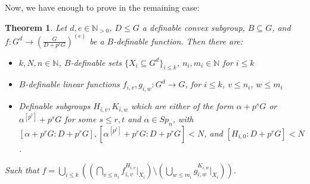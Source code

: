 \documentclass[a4paper,11pt]{article}
\newtheorem{theorem}{Theorem}[section]
\newcommand{\Spn}{Sp_n}
\begin{document}
\noindent Now, we have enough to prove  in the remaining case:
\begin{theorem}\label{prG uniformisable version}
    Let $d,e\in\mathbb{N}_{>0}$, $D\leq G$ a definable convex subgroup, $B\subseteq G$, and $f:G^d\rightarrow (\frac{G}{D+p^rG})^{(e)}$ be a $B$-definable function. Then there are:
    \begin{itemize}
        \item $k,N,n\in \mathbb{N}$, $B$-definable sets $\{X_i\subseteq G^d\}_{i\leq k}$, $n_i,m_i\in \mathbb{N}$ for $i\leq k$
        \item  $B$-definable linear functions $f_{i,v},g_{i,w}:G^d\rightarrow G$, for $i\leq k$, $v\leq n_i$, $w\leq m_i$
        \item Definable subgroups $H_{i,v},K_{i,w}$ which are either of the form $\alpha+p^sG$ or $\alpha^{[p^t]}+p^sG$ for some $s\leq r, t$ and $\alpha\in \Spn$, with $[\alpha+p^rG:D+p^rG], [\alpha^{[p^t]}+p^rG:D+p^rG]< N$, and $[H_{i,0}:D+p^rG]<N$. %
    \end{itemize}
    Such that $f = \bigcup\limits_{i\leq k}((\bigcap\limits_{v\leq n_i}f_{i,v}^{H_{i,v}}|_{X_i})\setminus(\bigcup\limits_{w\leq m_i}g_{i,w}^{K_{i,w}}|_{X_i}))$.
\end{theorem}
\end{document}
